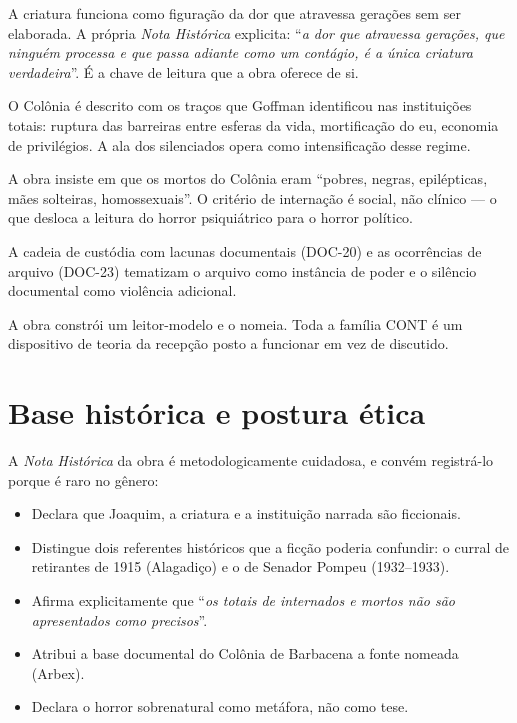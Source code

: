 \documentclass[11pt,a4paper]{article}
\begin{document}
\begin{description}[style=unboxed,leftmargin=0pt]
\item[Trauma e transmissão intergeracional.] A criatura funciona como
figuração da dor que atravessa gerações sem ser elaborada. A própria
\textit{Nota Histórica} explicita: ``\textit{a dor que atravessa gerações, que
ninguém processa e que passa adiante como um contágio, é a única criatura
verdadeira}''. É a chave de leitura que a obra oferece de si.

\item[Instituição total.] O Colônia é descrito com os traços que Goffman
identificou nas instituições totais: ruptura das barreiras entre esferas da
vida, mortificação do eu, economia de privilégios. A ala dos silenciados
opera como intensificação desse regime.

\item[Necropolítica e vidas descartáveis.] A obra insiste em que os mortos do
Colônia eram ``pobres, negras, epilépticas, mães solteiras, homossexuais''. O
critério de internação é social, não clínico --- o que desloca a leitura do
horror psiquiátrico para o horror político.

\item[Arquivo, poder e lacuna.] A cadeia de custódia com lacunas documentais
(DOC-20) e as ocorrências de arquivo (DOC-23) tematizam o arquivo como
instância de poder e o silêncio documental como violência adicional.

\item[Recepção e leitor implicado.] A obra constrói um leitor-modelo e o
nomeia. Toda a família CONT é um dispositivo de teoria da recepção posto a
funcionar em vez de discutido.
\end{description}

\section{Base histórica e postura ética}
\label{sec:etica}

A \textit{Nota Histórica} da obra é metodologicamente cuidadosa, e convém
registrá-lo porque é raro no gênero:

\begin{itemize}
\item Declara que Joaquim, a criatura e a instituição narrada são ficcionais.
\item Distingue dois referentes históricos que a ficção poderia confundir: o
curral de retirantes de 1915 (Alagadiço) e o de Senador Pompeu (1932--1933).
\item Afirma explicitamente que ``\textit{os totais de internados e mortos não
são apresentados como precisos}''.
\item Atribui a base documental do Colônia de Barbacena a fonte nomeada
(Arbex).
\item Declara o horror sobrenatural como metáfora, não como tese.
\end{itemize}
\end{document}
